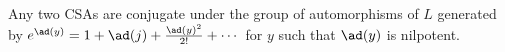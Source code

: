 Any two CSAs are conjugate under the group of automorphisms of $L$ generated by
$e^{\ad(y)} = 1 + \ad(j) + \frac{\ad(y)^2}{2!} + \cdots$ for $y$ such that
$\ad(y)$ is nilpotent.
